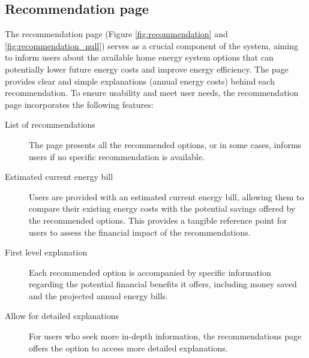 \subsection*{Recommendation page}

The recommendation page (Figure \ref{fig:recommendation} and \ref{fig:recommendation_null}) serves as a crucial component of the system, aiming to inform users about the available home energy system options that can potentially lower future energy costs and improve energy efficiency. 
The page provides clear and simple explanations (annual energy costs) behind each recommendation.
To ensure usability and meet user needs, the recommendation page incorporates the following features:
\begin{description}
  \item[List of recommendations] The page presents all the recommended options, or in some cases, informs users if no specific recommendation is available. 
  \item[Estimated current energy bill]  Users are provided with an estimated current energy bill, allowing them to compare their existing energy costs with the potential savings offered by the recommended options. This provides a tangible reference point for users to assess the financial impact of the recommendations.
  \item[First level explanation] Each recommended option is accompanied by specific information regarding the potential financial benefits it offers, including money saved and the projected annual energy bills. 
  \item[Allow for detailed sxplanations] For users who seek more in-depth information, the recommendations page offers the option to access more detailed explanations. 
\end{description}
